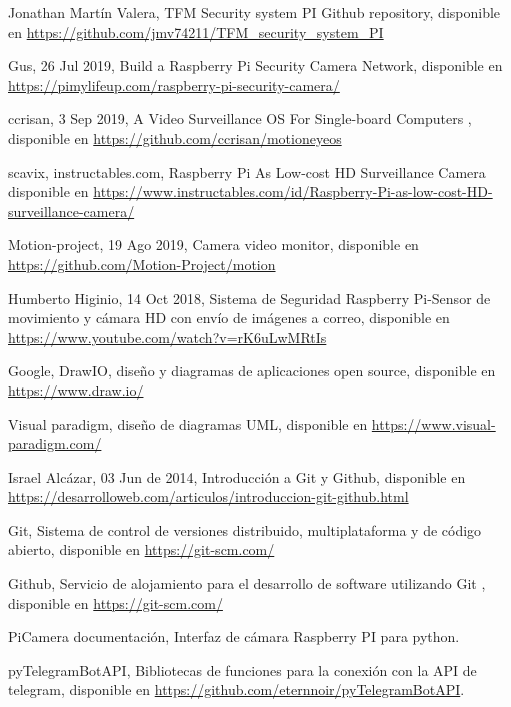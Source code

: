 \pagestyle{empty}

\begin{thebibliography}{99}

	 Jonathan Martín Valera, TFM Security system PI Github repository, disponible en \url{https://github.com/jmv74211/TFM_security_system_PI}

	 Gus, 26 Jul 2019, Build a Raspberry Pi Security Camera Network,	disponible en \url{https://pimylifeup.com/raspberry-pi-security-camera/}
	
	 ccrisan, 3 Sep 2019, A Video Surveillance OS For Single-board Computers ,	disponible en \url{https://github.com/ccrisan/motioneyeos}
	
	 scavix, instructables.com, Raspberry Pi As Low-cost HD Surveillance Camera disponible en \url{https://www.instructables.com/id/Raspberry-Pi-as-low-cost-HD-surveillance-camera/}
	
	 Motion-project, 19 Ago 2019, Camera video monitor, disponible en \url{https://github.com/Motion-Project/motion}
	
	 Humberto Higinio, 14 Oct 2018, Sistema de Seguridad Raspberry Pi-Sensor de movimiento y cámara HD con envío de imágenes a correo, disponible en \url{https://www.youtube.com/watch?v=rK6uLwMRtIs}
	
	 Google, DrawIO, diseño y diagramas de aplicaciones open source, disponible en \url{https://www.draw.io/}
	
	 Visual paradigm, diseño de diagramas UML, disponible en \url{https://www.visual-paradigm.com/}
	
	 Israel Alcázar, 03 Jun de 2014,  Introducción a Git y Github, disponible en \url{https://desarrolloweb.com/articulos/introduccion-git-github.html}
	
	 Git, Sistema de control de versiones distribuido, multiplataforma y de código abierto, disponible en \url{https://git-scm.com/}
	
	 Github, Servicio de alojamiento para el desarrollo de software utilizando Git , disponible en \url{https://git-scm.com/}
	
	 PiCamera documentación, Interfaz de cámara Raspberry PI para python.
	
	 pyTelegramBotAPI, Bibliotecas de funciones para la conexión con la API de telegram, disponible en \url{https://github.com/eternnoir/pyTelegramBotAPI}.
	

\end{thebibliography}
